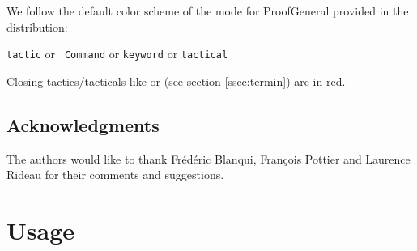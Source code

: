 \iffalse
\subsection*{How to read this documentation}

The syntax of the tactics is presented as follows:
\begin{itemize}
\item \ssrC{terminals} are in typewriter font and \ssrN{non terminals} are
  between angle brackets.
\item Optional parts of the grammar are surrounded by \optional{ }
  brackets. These should not be confused with verbatim brackets
  \ssrC{[ ]}, which are delimiters in the \ssr{} syntax.
\item A vertical rule {\optsep} indicates an alternative in the syntax, and
  should not be confused with a
  verbatim vertical rule between verbatim brackets \ssrC{[ | ]}.
\item A non empty list of non terminals (at least one item should be
  present) is represented by \ssrN{non terminals}$^+$. A possibly empty
  one is represented by \ssrN{non terminals}$^*$.
\item In a non empty list of non terminals, items are separated by blanks.
\end{itemize}
\fi

\ifhevea \else
\noindent We follow the default color scheme of the \ssr{} mode for
ProofGeneral provided in the distribution:

\centerline{
\textcolor{dkblue}{\texttt{tactic}} or \textcolor{dkviolet}{\tt
  Command} or \textcolor{dkgreen}{\tt keyword} or
\textcolor{dkpink}{\tt tactical}}

\noindent Closing tactics/tacticals like  or  (see section
\ref{ssec:termin}) are in red.
\fi

\subsection*{Acknowledgments}
The authors would like to thank Frédéric Blanqui, François Pottier
and Laurence Rideau for their comments and suggestions.

\newpage\section{Usage}

